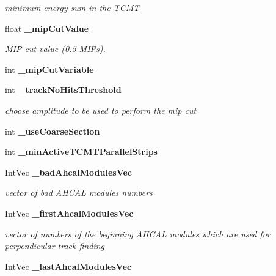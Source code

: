 \begin{DoxyCompactItemize}
\begin{DoxyCompactList}\small\item\em minimum energy sum in the TCMT \item\end{DoxyCompactList}\item 
float {\bf \_\-mipCutValue}\label{classCALICE_1_1AngleTrackFinder_a09632c19bf97a231d9ab2c1e6e32cc78}

\begin{DoxyCompactList}\small\item\em MIP cut value (0.5 MIPs). \item\end{DoxyCompactList}\item 
int {\bfseries \_\-mipCutVariable}\label{classCALICE_1_1AngleTrackFinder_afeb7153710a99c4b36d0842d2df63335}

\item 
int {\bf \_\-trackNoHitsThreshold}
\begin{DoxyCompactList}\small\item\em choose amplitude to be used to perform the mip cut \item\end{DoxyCompactList}\item 
int {\bfseries \_\-useCoarseSection}\label{classCALICE_1_1AngleTrackFinder_acbeb9d16089487bbc26fa28c1a83ca78}

\item 
int {\bfseries \_\-minActiveTCMTParallelStrips}\label{classCALICE_1_1AngleTrackFinder_ac050b4b2a689ca4d482a6ad75a53991c}

\item 
IntVec {\bf \_\-badAhcalModulesVec}\label{classCALICE_1_1AngleTrackFinder_a6d4442136ce5b168d27f32f3f753164c}

\begin{DoxyCompactList}\small\item\em vector of bad AHCAL modules numbers \item\end{DoxyCompactList}\item 
IntVec {\bf \_\-firstAhcalModulesVec}\label{classCALICE_1_1AngleTrackFinder_a53176eb4d890fcf6f41291a7aa7f7ecd}

\begin{DoxyCompactList}\small\item\em vector of numbers of the beginning AHCAL modules which are used for perpendicular track finding \item\end{DoxyCompactList}\item 
IntVec {\bf \_\-lastAhcalModulesVec}\label{classCALICE_1_1AngleTrackFinder_afe5e51f2a91a84dabaed6f6ad9cd60e9}


\end{DoxyCompactItemize}
